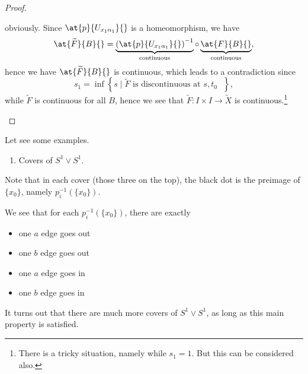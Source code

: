 \begin{proof}
\begin{enumerate}
\[		      \]
		      obviously. Since \(\at{p}{U_{x_1 \alpha _1}}{}\) is a homeomorphism, we have
		      \[
			      \at{\widetilde{F} }{B}{} = \underbrace{\left(\at{p}{U_{x_1 \alpha _1}}{} \right)^{-1}}_{\text{continuous} } \circ \underbrace{\vphantom{\left(\at{p}{U_{x_1 \alpha _1}}{} \right)^{-1}}\at{F}{B}{}}_{\text{continuous} },
		      \]
		      hence we have \(\at{\widetilde{F} }{B}{} \) is continuous, which leads to a contradiction since
		      \[
			      s_1 = \inf \left\{s\mid \widetilde{F} \text{ is discontinuous at \(s, t_0\) } \right\},
		      \]
		      while \(\widetilde{F} \) is continuous for all \(B\), hence we see that \(\widetilde{F} :I\times I\to \widetilde{X} \) is continuous.\footnote{There is a tricky situation, namely while \(s_1 = 1\). But this can be considered also.}
	\end{enumerate}
\end{proof}

\begin{eg}
	Let see some examples.
	\begin{enumerate}
		\item Covers of \(S^1\vee S^1\).
		      \begin{figure}[H]
			      \centering
			      \label{fig:eg:lec14:1}
		      \end{figure}
	\end{enumerate}
	Note that in each cover (those three on the top), the black dot is the preimage of \(\{x_0\}\), namely \(p_{i}^{-1} (\{x_0\})\).
	\begin{remark}
		We see that for each \(p_{i}^{-1} (\{x_0\})\), there are exactly
		\begin{itemize}
			\item one \(a\) edge goes out
			\item one \(b\) edge goes out
			\item one \(a\) edge goes in
			\item one \(b\) edge goes in
		\end{itemize}

		It turns out that there are much more covers of \(S^1\vee S^1\), as long as this main property is satisfied.
	\end{remark}
\end{eg}

